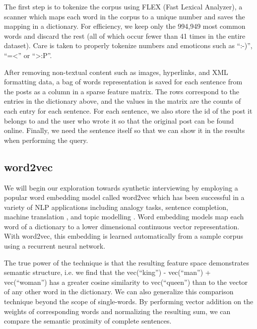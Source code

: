 \documentclass{sigchi}
\begin{document}
The first step is to tokenize the corpus using FLEX (Fast Lexical Analyzer), a scanner which maps each word in the corpus to a unique number and saves the mapping in a dictionary. For efficiency, we keep only the 994,949 most common words and discard the rest (all of which occur fewer than 41 times in the entire dataset). Care is taken to properly tokenize numbers and emoticons such as ``:-)'', ``=<'' or ``>:P''.

After removing non-textual content such as images, hyperlinks, and XML formatting data, a bag of words representation is saved for each sentence from the posts as a column in a sparse feature matrix. The rows correspond to the entries in the dictionary above, and the values in the matrix are the counts of each entry for each sentence. For each sentence, we also store the id of the post it belongs to and the user who wrote it so that the original post can be found online. Finally, we need the sentence itself so that we can show it in the results when performing the query.


\subsection{word2vec}

We will begin our exploration towards synthetic interviewing by employing a popular word embedding model called word2vec \cite{Mikolov2013,MikolovSCCD13} which has been successful in a variety of NLP applications including analogy tasks, sentence completion, machine translation \cite{W15-4908}, and topic modelling \cite{djuric2015hierarchical}. Word embedding models map each word of a dictionary to a lower dimensional continuous vector representation. With word2vec, this embedding is learned automatically from a sample corpus using a recurrent neural network. 

The true power of the technique is that the resulting feature space demonstrates semantic structure, i.e. we find that the vec(``king'') - vec(``man'') + vec(``woman'') has a greater cosine similarity to vec(``queen'') than to the vector of any other word in the dictionary. We can also generalize this comparison technique beyond the scope of single-words. By performing vector addition on the weights of corresponding words and normalizing the resulting sum, we can compare the semantic proximity of complete sentences. 
\end{document}

